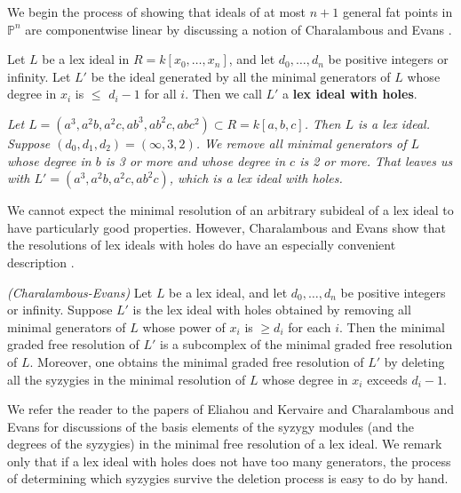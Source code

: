 \documentclass{article}
\begin{document}
We begin the process of showing that ideals of at most $n+1$ general fat points in $\mathbb P^n$ are componentwise linear by discussing a notion of Charalambous and Evans \cite{CE:map}.

\begin{definition}
\label{lexwithholesdef}
Let $L$ be a lex ideal in $R=k[x_0,\dots,x_n]$, and let $d_0,\dots,d_n$ be positive integers or infinity. Let $L'$ be the ideal generated by all the minimal generators of $L$ whose degree in $x_i$ is $\le$ $d_i-1$ for all $i$. Then we call $L'$ a \textbf{lex ideal with holes}.
\end{definition}

\begin{example}\emph{
Let $L=(a^3,a^2b,a^2c,ab^3,ab^2c,abc^2) \subset R=k[a,b,c]$. Then $L$ is a lex ideal. Suppose $(d_0,d_1,d_2)=(\infty,3,2)$. We remove all minimal generators of $L$ whose degree in $b$ is 3 or more and whose degree in $c$ is 2 or more. That leaves us with $L'=(a^3,a^2b,a^2c,ab^2c)$, which is a lex ideal with holes.}
\end{example}

We cannot expect the minimal resolution of an arbitrary subideal of a lex ideal to have particularly good properties. However, Charalambous and Evans show that the resolutions of lex ideals with holes do have an especially convenient description \cite{CE:map}.

\begin{theorem}
\label{grahamharathm}
\emph{(Charalambous-Evans)} Let $L$ be a lex ideal, and let $d_0, \dots, d_n$ be positive integers or infinity. Suppose $L'$ is the lex ideal with holes obtained by removing all minimal generators of $L$ whose power of $x_i$ is $\ge d_i$ for each $i$. Then the minimal graded free resolution of $L'$ is a subcomplex of the minimal graded free resolution of $L$. Moreover, one obtains the minimal graded free resolution of $L'$ by deleting all the syzygies in the minimal resolution of $L$ whose degree in $x_i$ exceeds $d_i-1$.
\end{theorem}

We refer the reader to the papers of Eliahou and Kervaire \cite{EK} and Charalambous and Evans \cite{CE:map} for discussions of the basis elements of the syzygy modules (and the degrees of the syzygies) in the minimal free resolution of a lex ideal. We remark only that if a lex ideal with holes does not have too many generators, the process of determining which syzygies survive the deletion process is easy to do by hand.
\end{document}
